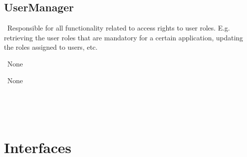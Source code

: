 \subsection{UserManager}\label{comp:OnlineServiceOnlineServiceUserManager}
	\begin{description}
		\item[Responsibility:]~Responsible for all functionality related to access rights to user roles. E.g. retrieving the user roles that are mandatory for a certain application, updating the roles assigned to users, etc.
		\item[Super-components:]~None
		\item[Sub-components:]~None
		\item[Provided interfaces:]~\iconprovided{}~
		\item[Required interfaces:]~\iconrequired{}~		
	\end{description}


\section{Interfaces} \label{sec:interfaces}

